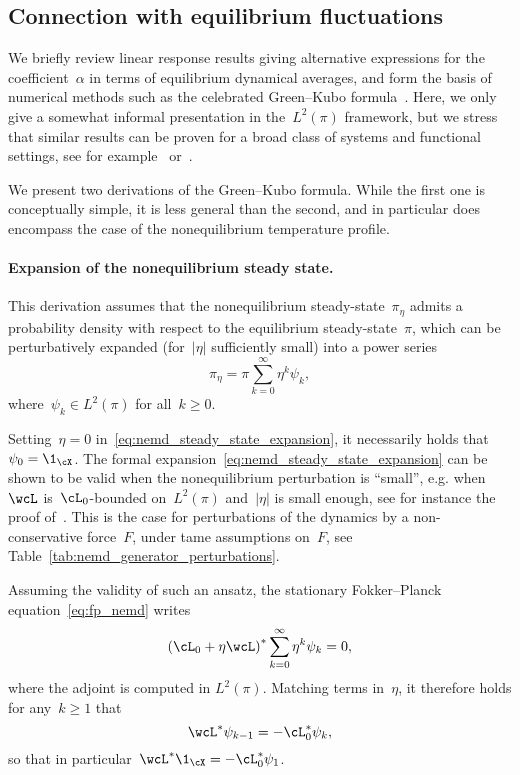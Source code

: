 \subsection{Connection with equilibrium fluctuations}
\label{subsec:linear_response_theory}
We briefly review linear response results giving alternative expressions for the coefficient~$\alpha$ in terms of equilibrium dynamical averages, and form the basis of numerical methods such as the celebrated Green--Kubo formula~\cite{green1954,kubo1957,kubo1957b}. Here, we only give a somewhat informal presentation in the~$L^2(\pi)$ framework, but we stress that similar results can be proven for a broad class of systems and functional settings, see for example~\cite{hairer_2010} or~\cite[Section 5.2]{lelievre2016}.

We present two derivations of the Green--Kubo formula. While the first one is conceptually simple, it is less general than the second, and in particular does encompass the case of the nonequilibrium temperature profile.

\paragraph{Expansion of the nonequilibrium steady state.}
This derivation assumes that the nonequilibrium steady-state~$\pi_\eta$ admits a probability density with respect to the equilibrium steady-state~$\pi$, which can be perturbatively expanded (for~$|\eta|$ sufficiently small) into a power series
\begin{equation}
    \label{eq:nemd_steady_state_expansion}
    \pi_\eta=\pi\sum_{k=0}^\infty \eta^k\psi_k,
\end{equation}
where~$\psi_k\in L^2(\pi)$ for all~$k\geq 0$.

Setting~$\eta=0$ in~\eqref{eq:nemd_steady_state_expansion}, it necessarily holds that~$\psi_0=\1_{\cX}$.
The formal expansion~\eqref{eq:nemd_steady_state_expansion} can be shown to be valid when the nonequilibrium perturbation is ``small'', e.g. when~$\wcL$ is~$\cL_0$-bounded on~$L^2(\pi)$ and~$|\eta|$ is small enough, see for instance the proof of~\cite[Theorem 5.2]{lelievre2016}. This is the case for perturbations of the dynamics by a non-conservative force~$F$, under tame assumptions on~$F$, see Table~\ref{tab:nemd_generator_perturbations}.

Assuming the validity of such an ansatz, the stationary Fokker--Planck equation~\eqref{eq:fp_nemd} writes
\begin{equation}
    \label{eq:fp_equation_formal}
    \left(\cL_0+\eta\wcL\right)^*\sum_{k=0}^\infty \eta^k\psi_k=0,
\end{equation}
where the adjoint is computed in $L^2(\pi)$.
Matching terms in~$\eta$, it therefore holds for any~$k\geq 1$ that
\begin{equation}
    \wcL^*\psi_{k-1}=-\cL_0^*\psi_k,
\end{equation}
so that in particular~$\wcL^*\1_{\cX}=-\cL_0^*\psi_1$. 

